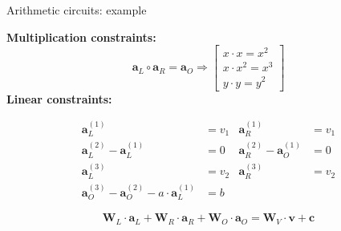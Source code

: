 \documentclass{zkdl-presentation-template}
\begin{document}
\begin{frame}{Arithmetic circuits: example}
    \begin{example}        
        \textbf{Multiplication constraints:}
        \begin{equation*}
            \mathbf{a}_L \circ \mathbf{a}_R = \mathbf{a}_O \Rightarrow \begin{bmatrix} 
                x \cdot x = x^2 \\
                x \cdot x^2 = x^3 \\ 
                y \cdot y = y^2
            \end{bmatrix}
        \end{equation*}
            \textbf{Linear constraints:}

    \begin{equation*}
        \begin{aligned}
            \mathbf{a}_L^{(1)} &= v_1 & \mathbf{a}_R^{(1)} &= v_1 \\
            \mathbf{a}_L^{(2)} - \mathbf{a}_L^{(1)} &= 0 & \mathbf{a}_R^{(2)} - \mathbf{a}_O^{(1)} &= 0 \\
            \mathbf{a}_L^{(3)} &= v_2 & \mathbf{a}_R^{(3)} &= v_2 \\
            \mathbf{a}_O^{(3)} - \mathbf{a}_O^{(2)} - a \cdot \mathbf{a}_L^{(1)} &= b &
        \end{aligned}
    \end{equation*}
    
    \begin{equation*}
    \mathbf{W}_L \cdot \mathbf{a}_L + \mathbf{W}_R \cdot \mathbf{a}_R + \mathbf{W}_O \cdot \mathbf{a}_O = \mathbf{W}_V \cdot \mathbf{v} + \mathbf{c}
    \end{equation*}
    \end{example}
\end{frame}
\end{document}
